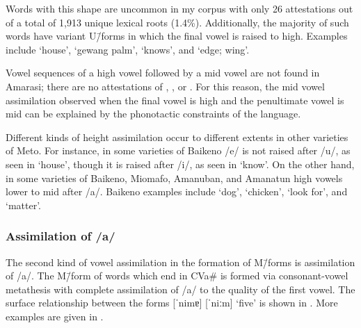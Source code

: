 Words with this shape are uncommon in my corpus
with only 26 attestations out of a total of 1,913 unique lexical roots (1.4\%).
Additionally, the majority of such words have
variant U\=/forms in which the final vowel is raised to high.
Examples include  {\tl}  `house',
 {\tl}  `gewang palm',
 {\tl}  `knows',
and  {\tl}  `edge; wing'.

Vowel sequences of a high vowel followed by a mid vowel are not found in Amarasi;
there are no attestations of , ,  or .
For this reason, the mid vowel assimilation observed when the final vowel
is high and the penultimate vowel is mid
can be explained by the phonotactic constraints of the language.

Different kinds of height assimilation occur to different
extents in other varieties of Meto.
For instance, in some varieties of Baikeno
/e/ is not raised after /u/, as seen in  {\ra}  `house',
though it is raised after /i/, as seen in  {\ra}  `know'.
On the other hand, in some varieties of Baikeno, Miomafo, Amanuban, and
Amanatun high vowels lower to mid after /a/.
Baikeno examples include  {\ra}  `dog',
 {\ra}  `chicken',  {\ra}  `look for',
and  {\ra}  `matter'.

\subsubsection{Assimilation of /a/}\label{sec:AssOfA}
The second kind of vowel assimilation in the formation of M\=/forms is assimilation of /a/.
The M\=/form of words which end in CVa{\#} is formed via consonant-vowel metathesis with
complete assimilation of /a/ to the quality of the first vowel.
The surface relationship between the forms
 [ˈnimɐ] {\ra}  [ˈniːm] `five' is shown in .
More examples are given in .

